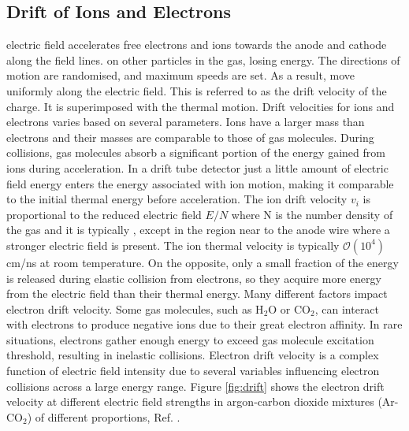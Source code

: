 \subsection{Drift of Ions and Electrons}
 electric field accelerates free electrons and ions towards the anode and cathode 
along the field lines. 
on other particles in the gas, 
losing energy. The directions of motion are randomised, and maximum speeds are set. As a result, 
 move uniformly along the electric field. This is referred to as the drift velocity of the 
charge. It is superimposed with the thermal motion.
Drift velocities for ions and electrons varies based on several parameters. Ions have a larger mass 
than electrons and their masses are comparable to those of gas molecules. During collisions, gas 
molecules absorb a significant portion of the energy gained from ions during acceleration. In a drift 
tube detector just a little amount of electric field energy enters the energy associated with ion motion, 
making it comparable to the initial thermal energy before acceleration. 
The ion drift velocity $v_i$ is proportional to the reduced electric field $E/N$ where N is the number density of the gas 
and it is typically ,
except in the region near to the anode wire where a stronger 
electric field is present. The ion thermal velocity is typically $\mathcal{O}(10^4)$ cm/ns at room temperature.
On the opposite, only a small fraction of the energy is released during elastic collision from electrons, 
so they acquire more energy from the electric field than their thermal energy.
Many different factors impact electron drift velocity. Some gas molecules, such as H$_2$O or CO$_2$, 
can interact with electrons to produce negative ions due to their great electron affinity. In rare situations, 
electrons gather enough energy to exceed gas molecule excitation threshold, resulting in inelastic collisions. 
Electron drift velocity is a complex function of electric field intensity due to several variables influencing 
electron collisions across a large energy range. Figure \ref{fig:drift} shows the electron drift
velocity at different electric field strengths in argon-carbon dioxide mixtures (Ar-CO$_2$) of different
proportions, Ref. \cite{ZHAO1994485}.

